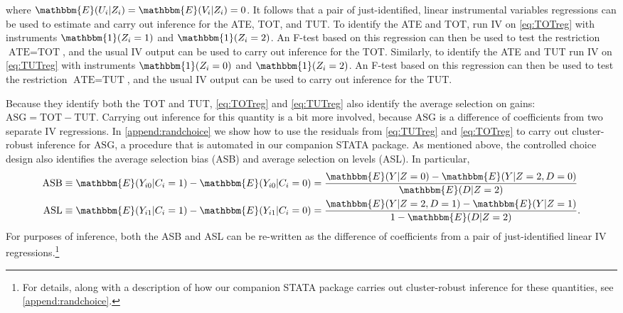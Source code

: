 \documentclass[11pt, a4paper]{article}
\begin{document}
where $\mathbbm{E}(U_i|Z_i) = \mathbbm{E}(V_i|Z_i) = 0$.
It follows that a pair of just-identified, linear instrumental variables regressions can be used to estimate and carry out inference for the ATE, TOT, and TUT. To identify the ATE and TOT, run IV on \eqref{eq:TOTreg} with instruments $\mathbbm{1}(Z_i = 1)$ and $\mathbbm{1}(Z_i=2)$. An F-test based on this regression can then be used to test the restriction $\text{ATE} = \text{TOT}$, and the usual IV output can be used to carry out inference for the TOT. Similarly, to identify the ATE and TUT run IV on \ref{eq:TUTreg} with instruments $\mathbbm{1}(Z_i = 0)$ and $\mathbbm{1}(Z_i = 2)$. An F-test based on this regression can then be used to test the restriction $\text{ATE} = \text{TUT}$, and the usual IV output can be used to carry out inference for the TUT. 

Because they identify both the TOT and TUT, \eqref{eq:TOTreg} and \eqref{eq:TUTreg} also identify the average selection on gains: $\text{ASG} = \text{TOT} - \text{TUT}$.
Carrying out inference for this quantity is a bit more involved, because $\text{ASG}$ is a difference of coefficients from two separate IV regressions. 
In \ref{append:randchoice} we show how to use the residuals from \eqref{eq:TUTreg} and \eqref{eq:TOTreg} to carry out cluster-robust inference for $\text{ASG}$, a procedure that is automated in our companion STATA package.
As mentioned above, the controlled choice design also identifies the average selection bias (ASB) and average selection on levels (ASL).
In particular,
\begin{align}
\label{eq:ASB}
    \text{ASB} &\equiv \mathbbm{E}(Y_{i0}|C_i=1) - \mathbbm{E}(Y_{i0}|C_i = 0) = \frac{\mathbbm{E}(Y|Z=0) - \mathbbm{E}(Y|Z=2,D=0)}{\mathbbm{E}(D|Z=2)}\\
    \label{eq:ASL}
    \text{ASL} &\equiv \mathbbm{E}(Y_{i1}|C_i = 1) - \mathbbm{E}(Y_{i1}|C_i=0) = \frac{\mathbbm{E}(Y|Z=2,D=1) - \mathbbm{E}(Y|Z=1)}{1 - \mathbbm{E}(D|Z=2)}.
\end{align}
For purposes of inference, both the ASB and ASL can be re-written as the difference of coefficients from a pair of just-identified linear IV regressions.\footnote{For details, along with a description of how our companion STATA package carries out cluster-robust inference for these quantities, see \ref{append:randchoice}.}


\end{document}
